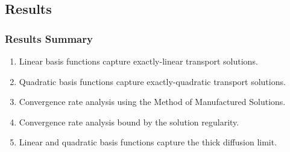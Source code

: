 \documentclass[compress,10pt]{beamer}
\begin{document}
\subsection{Results}
\begin{frame}[t]\frametitle{Results Summary}
\begin{block}{}
\begin{enumerate}
\item Linear basis functions capture exactly-linear transport solutions.
\item Quadratic basis functions capture exactly-quadratic transport solutions.
\item Convergence rate analysis using the Method of Manufactured Solutions. 
\item Convergence rate analysis bound by the solution regularity.
\item Linear and quadratic basis functions capture the thick diffusion limit.
\end{enumerate}
\end{block}
\end{frame}
\end{document}
